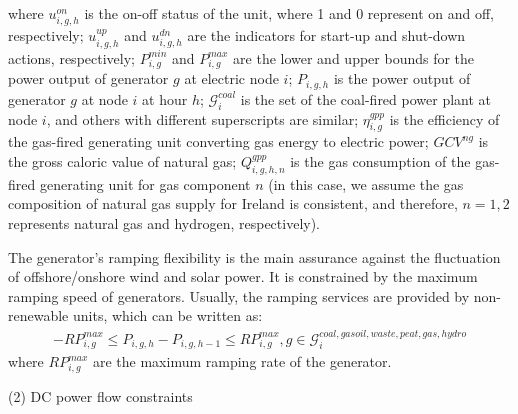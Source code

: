 \documentclass[sn-mathphys,Numbered]{sn-jnl}%
\theoremstyle{thmstyleone}%
\theoremstyle{thmstyletwo}%
\theoremstyle{thmstylethree}%
\begin{document}
where $u_{i,g,h}^{on}$ is the on-off status of the unit, where 1 and 0 represent on and off, respectively; $u_{i,g,h}^{up}$ and $u_{i,g,h}^{dn}$ are the indicators for start-up and shut-down actions, respectively; $P_{i,g}^{min}$ and $P_{i,g}^{max}$ are the lower and upper bounds for the power output of generator $g$ at electric node $i$; $P_{i,g,h}$ is the power output of generator $g$ at node $i$ at hour $h$; $\mathcal{G}_i^{coal}$ is the set of the coal-fired power plant at node $i$, and others with different superscripts are similar; $\eta_{i,g}^{gpp}$ is the efficiency of the gas-fired generating unit converting gas energy to electric power; $GCV^{ng}$ is the gross caloric value of natural gas; $Q_{i,g,h,n}^{gpp}$ is the gas consumption of the gas-fired generating unit for gas component $n$ (in this case, we assume the gas composition of natural gas supply for Ireland is consistent, and therefore, $n=1,2$ represents natural gas and hydrogen, respectively).

The generator's ramping flexibility is the main assurance against the fluctuation of offshore/onshore wind and solar power. It is constrained by the maximum ramping speed of generators. Usually, the ramping services are provided by non-renewable units, which can be written as:
\begin{gather}
    -RP_{i,g}^{max} \leq P_{i,g,h} - P_{i,g,h-1} \leq RP_{i,g}^{max}, g \in \mathcal{G}_i^{coal,gasoil, waste, peat, gas, hydro}
\end{gather}
where $RP_{i,g}^{max}$ are the maximum ramping rate of the generator.

(2) DC power flow constraints
\end{document}
